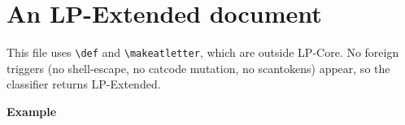 \documentclass{article}
\def\mymacro#1{\textbf{#1}}
\begin{document}
\section{An LP-Extended document}

This file uses \verb|\def| and \verb|\makeatletter|, which are
outside LP-Core. No foreign triggers (no shell-escape, no catcode
mutation, no scantokens) appear, so the classifier returns LP-Extended.

\mymacro{Example}
\end{document}
